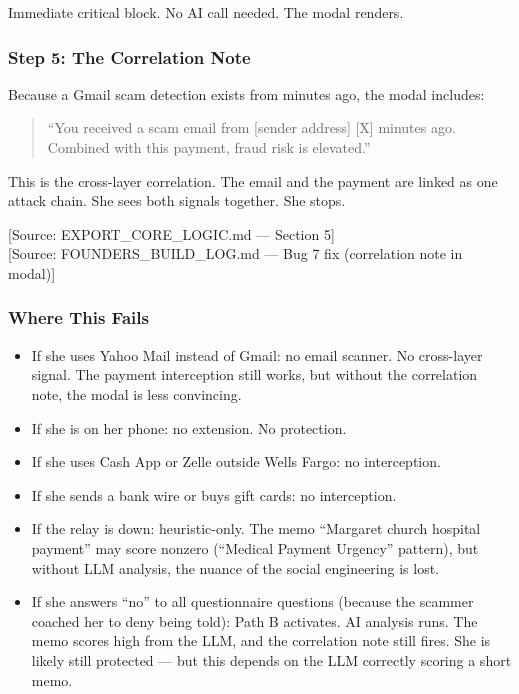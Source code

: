 \documentclass[11pt, letterpaper]{article}
\newcommand{\source}[1]{\textcolor{citation}{[Source: #1]}}
\begin{document}
  Immediate critical block. No AI call needed. The modal renders.

  \subsubsection{Step 5: The Correlation Note}

  Because a Gmail scam detection exists from minutes ago, the modal includes:

  \begin{quote}
  ``You received a scam email from [sender address] [X] minutes ago. Combined with this payment, fraud risk is elevated.''
  \end{quote}

  This is the cross-layer correlation. The email and the payment are linked as one attack chain. She sees both signals together. She stops.

  \source{EXPORT\_CORE\_LOGIC.md --- Section 5}\\
  \source{FOUNDERS\_BUILD\_LOG.md --- Bug 7 fix (correlation note in modal)}

  \subsubsection{Where This Fails}

  \begin{itemize}[nosep]
    \item If she uses Yahoo Mail instead of Gmail: no email scanner. No cross-layer signal. The payment interception still works, but without the correlation note, the modal is less convincing.
    \item If she is on her phone: no extension. No protection.
    \item If she uses Cash App or Zelle outside Wells Fargo: no interception.
    \item If she sends a bank wire or buys gift cards: no interception.
    \item If the relay is down: heuristic-only. The memo ``Margaret church hospital payment'' may score nonzero (``Medical Payment Urgency'' pattern), but without LLM analysis, the nuance of the social engineering is lost.
    \item If she answers ``no'' to all questionnaire questions (because the scammer coached her to deny being told): Path B activates. AI analysis runs. The memo scores high from the LLM, and the correlation note still fires. She is likely still protected --- but this depends on the LLM correctly scoring a short memo.
  \end{itemize}
\end{document}

